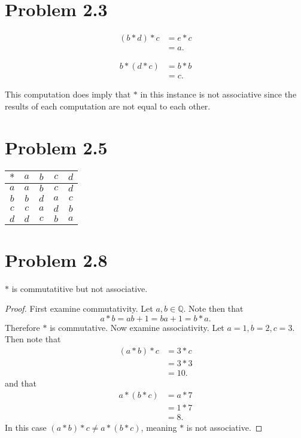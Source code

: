 \documentclass[12pt]{extarticle}
\begin{document}
\section*{Problem 2.3}

\begin{align*}
	(b * d) * c &= e * c \\
							&= a
.\end{align*}

\begin{align*}
	b * (d * c) &= b * b \\
							&= c
.\end{align*}

This computation does imply that $*$ in this instance is not associative since the results of each computation are not equal to each other.

\section*{Problem 2.5}

\begin{center}
	\begin{tabular}{c|c|c|c|c}
		$*$ & $a$ & $b$ & $c$ & $d$ \\\hline
		$a$ & $a$ & $b$ & $c$ & $d$ \\\hline
		$b$ & $b$ & $d$ & $a$ & $c$ \\\hline
		$c$ & $c$ & $a$ & $d$ & $b$ \\\hline
		$d$ & $d$ & $c$ & $b$ & $a$ \\
	\end{tabular}
\end{center}

\section*{Problem 2.8}

$*$ is commutatitive but not associative.

\begin{proof}
	First examine commutativity. Let $a,b \in \mathbb{Q}$. Note then that
	\[
		a * b = ab + 1 = ba + 1 = b * a
	.\]
	Therefore $*$ is commutative. Now examine associativity. Let $a = 1, b = 2, c = 3$. Then note that
	\begin{align*}
		(a * b) * c &= 3 * c \\
								&= 3 * 3 \\
								&= 10
	.\end{align*}
	and that
	\begin{align*}
		a * (b * c) &= a * 7 \\
								&= 1 * 7 \\
								&= 8
	.\end{align*}
	In this case $(a * b) * c \neq a * (b * c)$, meaning $*$ is not associative.
\end{proof}
\end{document}
